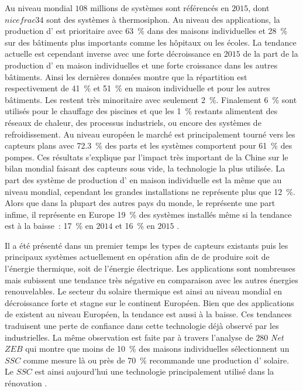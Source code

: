 
Au niveau mondial $108$ millions de systèmes sont référencés en $2015$, dont $nicefrac{3}{4}$
sont des systèmes à thermosiphon.
Au niveau des applications, la production d’ est prioritaire avec \SI{63}{\percent}
dans des maisons individuelles et \SI{28}{\percent} sur des bâtiments plus importants comme
les hôpitaux ou les écoles. La tendance actuelle est cependant inverse avec une forte
décroissance en $2015$ de la part de la production d’ en maison individuelles
et une forte croissance dans les autres bâtiments. Ainsi les dernières données montre que
la répartition est respectivement de \SI{41}{\percent} et \SI{51}{\percent} en maison
individuelle et pour les autres bâtiments.
Les  restent très minoritaire avec seulement \SI{2}{\percent}.
Finalement \SI{6}{\percent} sont utilisés pour le chauffage des piscines et que les \SI{1}{\percent}
restants alimentent des réseaux de chaleur, des processus industriels, ou encore des systèmes de
refroidissement.
Au niveau européen le marché est principalement tourné vers les capteurs plans avec \SI{72.3}{\percent}
des parts et les systèmes comportent pour \SI{61}{\percent} des pompes.
Ces résultats s’explique par l’impact très important de la Chine sur le bilan mondial faisant
des capteurs sous vide, la technologie la plus utilisée.
La part des système de production d’ en maison individuelle est la même que au niveau mondial,
cependant les grandes installations ne représente plus que \SI{12}{\percent}. Alors que
dans la plupart des autres pays du monde, le  représente une part infime, il
représente en Europe \SI{19}{\percent} des systèmes installés même si la tendance est à
la baisse~: \SI{17}{\percent} en $2014$ \parencite{Mauthner2016} et \SI{16}{\percent} en
$2015$ \parencite{Weiss2017}.

Il a été présenté dans un premier temps les types de capteurs existants puis les
principaux  systèmes actuellement en opération afin de de produire soit de l’énergie
thermique, soit de l’énergie électrique. Les applications sont nombreuses mais subissent
une tendance très négative en comparaison avec les autres énergies renouvelables. Le
secteur du solaire thermique est ainsi au niveau mondial en décroissance forte et stagne
sur le continent Européen. Bien que des applications de  existent au niveau
Européen, la tendance est aussi à la baisse. Ces tendances traduisent une perte de
confiance dans cette technologie déjà observé par les industrielles. La même observation
est faite par \textcite{Musall2010} à travers l’analyse de $280$ \textit{Net}\,$ZEB$ qui
montre que moins de \SI{10}{\percent} des maisons individuelles sélectionnent un $SSC$
comme mesure là ou près de \SI{70}{\percent} recommande une production d’
solaire. Le $SSC$ est ainsi aujourd’hui une technologie principalement utilisé dans la rénovation
\parencite{Ellehauge2003}.



